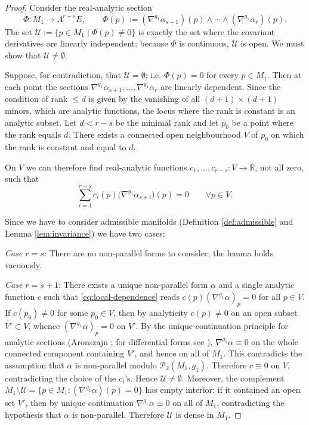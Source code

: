 \documentclass[11pt,reqno]{amsart}
\theoremstyle{plain}
\theoremstyle{definition}
\numberwithin{equation}{section}
\begin{document}
\begin{proof}
Consider the real‑analytic section
\[
\Phi:M_1\longrightarrow\Lambda^{r-s}E,\qquad
\Phi(p):=(\nabla^{g_1}\alpha_{s+1})(p)\wedge\cdots\wedge(\nabla^{g_1}\alpha_r)(p).
\]
The set $\mathcal{U}:=\{p\in M_1\mid\Phi(p)\neq0\}$ is exactly the set where the covariant derivatives are linearly independent; because $\Phi$ is continuous, $\mathcal{U}$ is open.  We must show that $\mathcal{U}\neq\emptyset$.

Suppose, for contradiction, that $\mathcal{U}=\emptyset$; i.e. $\Phi(p)=0$ for every $p\in M_1$.  Then at each point the sections $\nabla^{g_1}\alpha_{s+1},\dots,\nabla^{g_1}\alpha_r$ are linearly dependent.  Since the condition of rank $\le d$ is given by the vanishing of all $(d+1)\times(d+1)$ minors, which are analytic functions, the locus where the rank is constant is an analytic subset.  Let $d<r-s$ be the minimal rank and let $p_0$ be a point where the rank equals $d$.  There exists a connected open neighbourhood $V$ of $p_0$ on which the rank is constant and equal to $d$.

On $V$ we can therefore find real‑analytic functions $c_1,\dots,c_{r-s}:V\to\mathbb R$, not all zero, such that
\begin{equation}\label{eq:local-dependence}
\sum_{i=1}^{r-s}c_i(p)\bigl(\nabla^{g_1}\alpha_{s+i}\bigr)(p)=0\qquad\forall p\in V.
\end{equation}

Since we have to consider admissible manifolds (Definition \ref{def:admissible} and Lemma \ref{lem:invariance}) we have two cases:

\textit{Case $r=s$}: There are no non‑parallel forms to consider; the lemma holds vacuously.

\textit{Case $r=s+1$}: There exists a unique non‑parallel form $\alpha$ and a single analytic function $c$ such that \eqref{eq:local-dependence} reads $c(p)(\nabla^{g_1}\alpha)_p = 0$ for all $p\in V$.  If $c(p_0)\neq 0$ for some $p_0\in V$, then by analyticity $c(p)\neq 0$ on an open subset $V'\subset V$, whence $(\nabla^{g_1}\alpha)_p=0$ on $V'$. By the unique‑continuation principle for analytic sections (Aronszajn \cite{Aronszajn1957}; for differential forms see \cite{AKS1962}), $\nabla^{g_1}\alpha\equiv 0$ on the whole connected component containing $V'$, and hence on all of $M_1$. This contradicts the assumption that $\alpha$ is non‑parallel modulo $\mathcal{P}_2(M_1,g_1)$. Therefore $c\equiv 0$ on $V$, contradicting the choice of the $c_i$'s.  Hence $\mathcal{U}\neq\emptyset$. Moreover, the complement $M_1\setminus\mathcal{U} = \{p \in M_1 : (\nabla^{g_1}\alpha)(p) = 0\}$ has empty interior: if it contained an open set $V'$, then by unique continuation $\nabla^{g_1}\alpha \equiv 0$ on all of $M_1$, contradicting the hypothesis that $\alpha$ is non-parallel. Therefore $\mathcal{U}$ is dense in $M_1$.


\end{proof}
\end{document}
